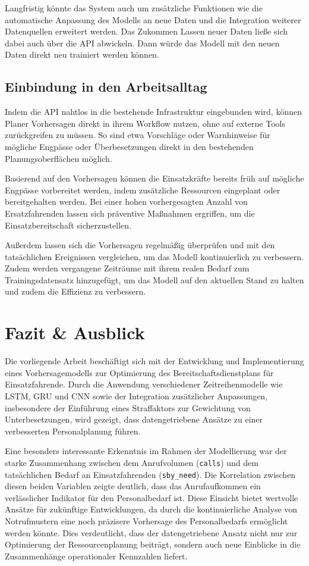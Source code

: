 \documentclass[%
pdftex,
oneside,			%
11pt,				%
parskip=half,		%
headheight = 12pt,	%
headsepline,		%
footsepline,		%
footheight = 16pt,	%
abstracton,		%
DIV=calc,		%
BCOR=8mm,		%
headinclude=false,	%
footinclude=false,	%
listof=totoc,		%
toc=bibliography,	%
]{scrreprt}	%
\begin{document}
        Langfristig könnte das System auch um zusätzliche Funktionen wie die automatische Anpassung des Modells an neue Daten und die Integration weiterer Datenquellen erweitert werden.
        Das Zukommen Lassen neuer Daten ließe sich dabei auch über die API abwickeln.
        Dann würde das Modell mit den neuen Daten direkt neu trainiert werden können.

    \section{Einbindung in den Arbeitsalltag}

        Indem die API nahtlos in die bestehende Infrastruktur eingebunden wird, können Planer Vorhersagen direkt in ihrem Workflow nutzen, ohne auf externe Tools zurückgreifen zu müssen. 
        So sind etwa Vorschläge oder Warnhinweise für mögliche Engpässe oder Überbesetzungen direkt in den bestehenden Planungsoberflächen möglich.

        Basierend auf den Vorhersagen können die Einsatzkräfte bereits früh auf mögliche Engpässe vorbereitet werden, indem zusätzliche Ressourcen eingeplant oder bereitgehalten werden.
        Bei einer hohen vorhergesagten Anzahl von Ersatzfahrenden lassen sich präventive Maßnahmen ergriffen, um die Einsatzbereitschaft sicherzustellen.
        
        Außerdem lassen sich die Vorhersagen regelmäßig überprüfen und mit den tatsächlichen Ereignissen vergleichen, um das Modell kontinuierlich zu verbessern.
        Zudem werden vergangene Zeiträume mit ihrem realen Bedarf zum Trainingsdatensatz hinzugefügt, um das Modell auf den aktuellen Stand zu halten und zudem die Effizienz zu verbessern.
       

    \chapter{Fazit \& Ausblick}

        Die vorliegende Arbeit beschäftigt sich mit der Entwicklung und Implementierung eines Vorhersagemodells zur Optimierung des Bereitschaftsdienstplans für Einsatzfahrende. 
        Durch die Anwendung verschiedener Zeitreihenmodelle wie LSTM, GRU und CNN sowie der Integration zusätzlicher Anpassungen, insbesondere der Einführung eines Straffaktors zur Gewichtung von Unterbesetzungen, wird gezeigt, dass datengetriebene Ansätze zu einer verbesserten Personalplanung führen. 

        Eine besonders interessante Erkenntnis im Rahmen der Modellierung war der starke Zusammenhang zwischen dem Anrufvolumen (\texttt{calls}) und dem tatsächlichen Bedarf an Einsatzfahrenden (\texttt{sby\_need}). 
        Die Korrelation zwischen diesen beiden Variablen zeigte deutlich, dass das Anrufaufkommen ein verlässlicher Indikator für den Personalbedarf ist. 
        Diese Einsicht bietet wertvolle Ansätze für zukünftige Entwicklungen, da durch die kontinuierliche Analyse von Notrufmustern eine noch präzisere Vorhersage des Personalbedarfs ermöglicht werden könnte. 
        Dies verdeutlicht, dass der datengetriebene Ansatz nicht nur zur Optimierung der Ressourcenplanung beiträgt, sondern auch neue Einblicke in die Zusammenhänge operationaler Kennzahlen liefert.
\end{document}
